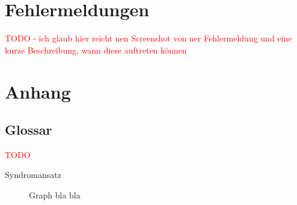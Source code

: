 \documentclass[enabledeprecatedfontcommands,fontsize=11pt,paper=a4,twoside]{scrartcl}
\newcommand*{\red}{\textcolor{red}}
\begin{document}
\section{Fehlermeldungen} \label{fehlermeldungen}
\red{TODO - ich glaub hier reicht nen Screenshot von ner Fehlermeldung und eine kurze Beschreibung, wann diese auftreten können}	

\newpage
\section{Anhang} \label{sec:anhang}	

\subsection{Glossar}
\red{TODO}
	
\begin{description}
	\item[Syndromansatz] Graph bla bla
\end{description}
	

\newpage
\end{document}

